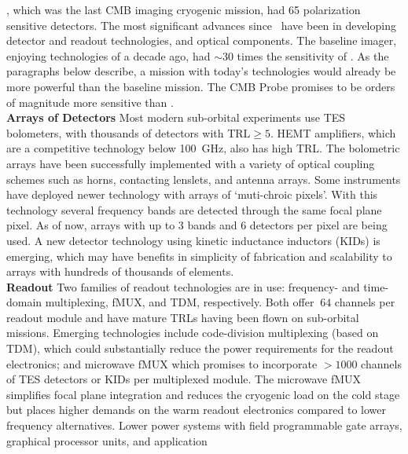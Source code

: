 \planck, which was the last CMB imaging cryogenic mission, had 65 polarization sensitive detectors. 
The most significant advances since \planck~have been in developing detector and readout technologies, and optical components.
The baseline imager, enjoying technologies of a decade ago, had $\sim$30 times the sensitivity of \planck.  
As the paragraphs below describe, a mission with today's technologies would already be 
more powerful than the baseline mission.  The CMB Probe promises to be orders of magnitude more 
sensitive than \planck.  \\
{\bf Arrays of Detectors} \hspace{0.1in} 
Most modern sub-orbital experiments use TES bolometers, with thousands of detectors with TRL$\geq 5$. 
HEMT amplifiers, which are a competitive technology below 100~GHz, also has high TRL.   
The bolometric arrays have been successfully implemented with a variety of optical coupling schemes such as horns, 
contacting lenslets, and antenna arrays. Some instruments have deployed newer technology with arrays of `muti-chroic pixels'. 
With this technology several frequency bands are detected through the same focal plane pixel. As of now, arrays with up 
to 3 bands and 6 detectors per pixel are being used. 
A new detector 
technology using kinetic inductance inductors (KIDs) is emerging, which may have benefits in simplicity of fabrication and 
scalability to arrays with hundreds of thousands of elements.  \\
{\bf Readout }  \hspace{0.1in} Two families of readout technologies are in use: frequency- and time-domain multiplexing, 
fMUX, and TDM, respectively.  Both offer $~64$ channels per readout module and have mature TRLs having been 
flown on sub-orbital missions.   Emerging technologies include code-division multiplexing (based on TDM), which could 
substantially reduce the power requirements for the readout electronics; and microwave fMUX which promises to 
incorporate $>1000$ channels of TES detectors or KIDs per multiplexed module. The microwave fMUX simplifies 
focal plane integration and reduces the cryogenic load on the cold stage but places higher 
demands on the warm readout electronics compared to lower frequency alternatives. 
Lower power systems with field programmable gate arrays, graphical processor units, and application 
